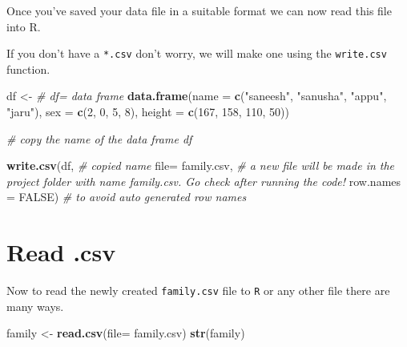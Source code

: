 \documentclass[
]{book}
\newenvironment{Shaded}{\begin{snugshade}}{\end{snugshade}}
\newcommand{\AttributeTok}[1]{\textcolor[rgb]{0.13,0.29,0.53}{#1}}
\newcommand{\CommentTok}[1]{\textcolor[rgb]{0.56,0.35,0.01}{\textit{#1}}}
\newcommand{\ConstantTok}[1]{\textcolor[rgb]{0.56,0.35,0.01}{#1}}
\newcommand{\DecValTok}[1]{\textcolor[rgb]{0.00,0.00,0.81}{#1}}
\newcommand{\FunctionTok}[1]{\textcolor[rgb]{0.13,0.29,0.53}{\textbf{#1}}}
\newcommand{\NormalTok}[1]{#1}
\newcommand{\OtherTok}[1]{\textcolor[rgb]{0.56,0.35,0.01}{#1}}
\newcommand{\StringTok}[1]{\textcolor[rgb]{0.31,0.60,0.02}{#1}}
\begin{document}
Once you've saved your data file in a suitable format we can now read this file into R.

If you don't have a \texttt{*.csv} don't worry, we will make one using the \texttt{write.csv} function.

\begin{Shaded}
\begin{Highlighting}[]
\NormalTok{df }\OtherTok{\textless{}{-}} \CommentTok{\# df= data frame}
  \FunctionTok{data.frame}\NormalTok{(}\AttributeTok{name =} \FunctionTok{c}\NormalTok{(}\StringTok{"saneesh"}\NormalTok{, }\StringTok{"sanusha"}\NormalTok{, }\StringTok{"appu"}\NormalTok{, }\StringTok{"jaru"}\NormalTok{),}
             \AttributeTok{sex =} \FunctionTok{c}\NormalTok{(}\DecValTok{2}\NormalTok{, }\DecValTok{0}\NormalTok{, }\DecValTok{5}\NormalTok{, }\DecValTok{8}\NormalTok{),}
             \AttributeTok{height =} \FunctionTok{c}\NormalTok{(}\DecValTok{167}\NormalTok{, }\DecValTok{158}\NormalTok{, }\DecValTok{110}\NormalTok{, }\DecValTok{50}\NormalTok{))}

\CommentTok{\# copy the name of the data frame \textasciigrave{}df\textasciigrave{}}

\FunctionTok{write.csv}\NormalTok{(df, }\CommentTok{\# copied name}
          \AttributeTok{file=} \StringTok{\textquotesingle{}family.csv\textquotesingle{}}\NormalTok{, }\CommentTok{\# a new file will be made in the project folder with name family.csv. Go check after running the code!}
          \AttributeTok{row.names =} \ConstantTok{FALSE}\NormalTok{) }\CommentTok{\# to avoid auto generated row names}
\end{Highlighting}
\end{Shaded}

\hypertarget{read-.csv}{%
\section{Read .csv}\label{read-.csv}}

Now to read the newly created \texttt{family.csv} file to \texttt{R} or any other file there are many ways.

\begin{Shaded}
\begin{Highlighting}[]
\NormalTok{family }\OtherTok{\textless{}{-}} \FunctionTok{read.csv}\NormalTok{(}\AttributeTok{file=} \StringTok{\textquotesingle{}family.csv\textquotesingle{}}\NormalTok{)}
\FunctionTok{str}\NormalTok{(family)}
\end{Highlighting}
\end{Shaded}
\end{document}
